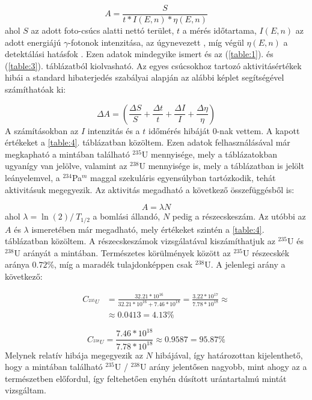 \begin{multicols}{2}
\begin{equation}
A
=
\frac{S}{t * I \left( E, n \right) * \eta \left( E, n \right)}
\end{equation}
ahol $S$ az adott foto-csúcs alatti nettó terület, $t$ a mérés időtartama, $I \left( E, n \right)$ az adott energiájú $\gamma$-fotonok intenzitása, az úgynevezett , míg végül $\eta \left( E, n \right)$ a detektálási hatásfok \citep{gamma_ray_spec}. \newline
Ezen adatok mindegyike ismert és az (\ref{table:1}). és (\ref{table:3}). táblázatból kiolvasható. Az egyes csúcsokhoz tartozó aktivitásértékek hibái a standard hibaterjedés szabályai alapján az alábbi képlet segítségével számíthatóak ki:

\begin{equation}
\Delta A
=
\left(
\frac{\Delta S}{S} + \frac{\Delta t}{t} + \frac{\Delta I}{I} + \frac{\Delta \eta}{\eta}
\right)
\end{equation}
A számításokban az $I$ intenzitás és a $t$ időmérés hibáját $0$-nak vettem. A kapott értékeket a \ref{table:4}. táblázatban közöltem. Ezen adatok felhasználásával már megkapható a mintában található $^{235}$U mennyisége, mely a táblázatokban ugyanígy van jelölve, valamint az $^{238}$U mennyisége is, mely a táblázatban is jelölt leányelemvel, a $^{234}$Pa$^{m}$ maggal szekuláris egyensúlyban tartózkodik, tehát aktivitásuk megegyezik. Az aktivitás megadható a következő összefüggésből is:

\begin{equation}
A = \lambda N
\end{equation}
ahol $\lambda = \ln \left( 2 \right) /\ T_{1/2}$ a bomlási állandó, $N$ pedig a részecskeszám. Az utóbbi az $A$ és $\lambda$ ismeretében már megadható, mely értékeket szintén a \ref{table:4}. táblázatban közöltem. A részecskeszámok vizsgálatával kiszámíthatjuk az $^{235}$U és $^{238}$U arányát a mintában. Természetes körülmények között az $^{235}$U részecskék aránya $0.72$\%, míg a maradék tulajdonképpen csak $^{238}$U. A jelenlegi arány a következő:

\begin{align}
C_{^{235}U}
&=
\frac{32.21 * 10^{16}}{32.21 * 10^{16} + 7.46 * 10^{18}}
=
\frac{3.22 * 10^{17}}{7.78 * 10^{18}}
\approx \nonumber \\
&\approx
0.0413
=
4.13 \%
\end{align}

\begin{equation}
C_{^{238}U}
=
\frac{7.46 * 10^{18}}{7.78 * 10^{18}}
\approx
0.9587
=
95.87 \%
\end{equation}
Melynek relatív hibája megegyezik az $N$ hibájával, így határozottan kijelenthető, hogy a mintában található $^{235}$U / $^{238}$U arány jelentősen nagyobb, mint ahogy az a természetben előfordul, így feltehetően enyhén dúsított urántartalmú mintát vizsgáltam.


\end{multicols}
